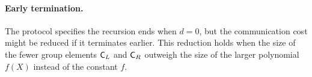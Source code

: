 \documentclass{article}
\theoremstyle{definition}
\newcommand{\benedikt}[1]{{\textcolor{red}{[Benedikt: #1]}}}
\newcommand{\benedikt}[1]{}
\begin{document}

\paragraph{Early termination.} The protocol specifies the recursion ends when $d=0$, but the communication cost might be reduced if it terminates earlier. This reduction holds when the size of the fewer group elements $\mathsf{C}_L$ and $\mathsf{C}_R$ outweigh the size of the larger polynomial $f(X)$ instead of the constant $f$.


%
\end{document}
